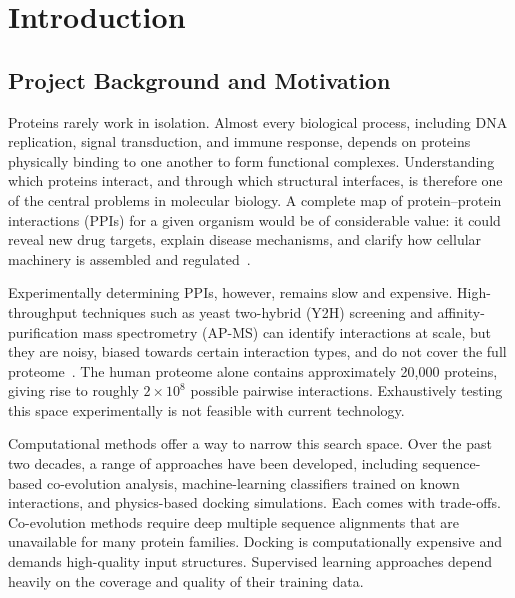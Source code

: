 \chapter{Introduction}
\label{ch:introduction}

\section{Project Background and Motivation}
\label{sec:intro-background}

Proteins rarely work in isolation.
Almost every biological process, including DNA replication, signal transduction, and immune response, depends on proteins physically binding to one another to form functional complexes.
Understanding which proteins interact, and through which structural interfaces, is therefore one of the central problems in molecular biology.
A complete map of protein--protein interactions (PPIs) for a given organism would be of considerable value: it could reveal new drug targets, explain disease mechanisms, and clarify how cellular machinery is assembled and regulated~\cite{zhang2025ppi}.

Experimentally determining PPIs, however, remains slow and expensive.
High-throughput techniques such as yeast two-hybrid (Y2H) screening and affinity-purification mass spectrometry (AP-MS) can identify interactions at scale, but they are noisy, biased towards certain interaction types, and do not cover the full proteome~\cite{zhang2025ppi}.
The human proteome alone contains approximately 20{,}000 proteins, giving rise to roughly $2 \times 10^{8}$ possible pairwise interactions.
Exhaustively testing this space experimentally is not feasible with current technology.

Computational methods offer a way to narrow this search space.
Over the past two decades, a range of approaches have been developed, including sequence-based co-evolution analysis, machine-learning classifiers trained on known interactions, and physics-based docking simulations.
Each comes with trade-offs.
Co-evolution methods require deep multiple sequence alignments that are unavailable for many protein families.
Docking is computationally expensive and demands high-quality input structures.
Supervised learning approaches depend heavily on the coverage and quality of their training data.

